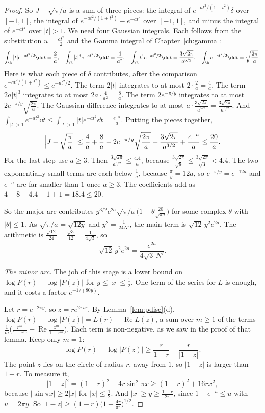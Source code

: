 \begin{proof}
So $J-\sqrt{\pi/a}$ is a sum of three pieces: the integral of $e^{-at^2/(1+t^2)}\delta$ over $[-1,1]$, the integral of $e^{-at^2/(1+t^2)}-e^{-at^2}$ over $[-1,1]$, and minus the integral of $e^{-at^2}$ over $|t|>1$. We need four Gaussian integrals. Each follows from the substitution $u=\frac{at^2}2$ and the Gamma integral of Chapter~\ref{ch:gamma}:
\[
\int_{\R}|t|e^{-at^2/2}\dd t=\frac2a,\quad\int_{\R}|t|^3e^{-at^2/2}\dd t=\frac4{a^2},\quad\int_\R t^4e^{-at^2/2}\dd t=\frac{3\sqrt{2\pi}}{a^{5/2}},\quad\int_\R e^{-at^2/2}\dd t=\sqrt{\frac{2\pi}a}.
\]
Here is what each piece of $\delta$ contributes, after the comparison $e^{-at^2/(1+t^2)}\le e^{-at^2/2}$. The term $2|t|$ integrates to at most $2\cdot\frac2a=\frac4a$. The term $2a|t|^3$ integrates to at most $2a\cdot\frac4{a^2}=\frac8a$. The term $2e^{-\pi/y}$ integrates to at most $2e^{-\pi/y}\sqrt{\frac{2\pi}a}$. The Gaussian difference integrates to at most $a\cdot\frac{3\sqrt{2\pi}}{a^{5/2}}=\frac{3\sqrt{2\pi}}{a^{3/2}}$. And $\int_{|t|>1}e^{-at^2}\dd t\le\int_{|t|>1}|t|e^{-at^2}\dd t=\frac{e^{-a}}a$. Putting the pieces together,
\[
\Bigl|J-\sqrt{\frac\pi a}\Bigr|\le\frac4a+\frac8a+2e^{-\pi/y}\sqrt{\frac{2\pi}a}+\frac{3\sqrt{2\pi}}{a^{3/2}}+\frac{e^{-a}}a\le\frac{20}a.
\]
For the last step use $a\ge3$. Then $\frac{3\sqrt{2\pi}}{a^{3/2}}\le\frac{4.4}a$, because $\frac{3\sqrt{2\pi}}{\sqrt a}\le\frac{3\sqrt{2\pi}}{\sqrt3}<4.4$. The two exponentially small terms are each below $\frac1a$, because $\frac\pi y=12a$, so $e^{-\pi/y}=e^{-12a}$ and $e^{-a}$ are far smaller than $1$ once $a\ge3$. The coefficients add as $4+8+4.4+1+1=18.4\le20$.

So the major arc contributes $y^{3/2}e^{2a}\sqrt{\pi/a}\,\bigl(1+\theta\frac{20}{\sqrt{\pi a}}\bigr)$ for some complex $\theta$ with $|\theta|\le1$. As $\sqrt{\pi/a}=\sqrt{12y}$ and $y^2=\frac1{24N'}$, the main term is $\sqrt{12}\,y^2e^{2a}$. The arithmetic is $\frac{\sqrt{12}}{24}=\frac{\sqrt3}{12}=\frac1{4\sqrt3}$, so
\[
\sqrt{12}\,y^2e^{2a}=\frac{e^{2a}}{4\sqrt3\,N'}.
\]

\emph{The minor arc.} The job of this stage is a lower bound on $\log P(r)-\log|P(z)|$ for $y\le|x|\le\frac12$. One term of the series for $L$ is enough, and it costs a factor $e^{-1/(80y)}$.

Let $r=e^{-2\pi y}$, so $z=re^{2\pi ix}$. By Lemma~\ref{lem:pdisc}(d), $\log P(r)-\log|P(z)|=L(r)-\operatorname{Re}L(z)$, a sum over $m\ge1$ of the terms $\frac1m\bigl(\frac{r^m}{1-r^m}-\operatorname{Re}\frac{z^m}{1-z^m}\bigr)$. Each term is non-negative, as we saw in the proof of that lemma. Keep only $m=1$:
\[
\log P(r)-\log|P(z)|\ge\frac r{1-r}-\frac r{|1-z|}.
\]
The point $z$ lies on the circle of radius $r$, away from $1$, so $|1-z|$ is larger than $1-r$. To measure it,
\[
|1-z|^2=(1-r)^2+4r\sin^2\pi x\ge(1-r)^2+16rx^2,
\]
because $|\sin\pi x|\ge2|x|$ for $|x|\le\frac12$. And $|x|\ge y\ge\frac{1-r}{2\pi}$, since $1-e^{-u}\le u$ with $u=2\pi y$. So $|1-z|\ge(1-r)\bigl(1+\frac{4r}{\pi^2}\bigr)^{1/2}$.


\end{proof}
